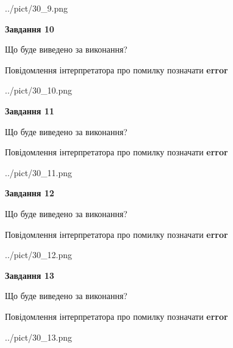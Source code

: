 \documentclass[11pt, ukrainian]{article}
\begin{document}
{\begin {large}
\begin{center}
	{../pict/30_9.png}
\end{center}
\newpage

{\begin {center}\textbf{Завдання 10}\end {center}}\par
Що буде виведено за виконання? \par
Повідомлення інтерпретатора про помилку позначати \textbf{error}

\begin{center}
	{../pict/30_10.png}
\end{center}
\newpage

{\begin {center}\textbf{Завдання 11}\end {center}}\par
Що буде виведено за виконання? \par
Повідомлення інтерпретатора про помилку позначати \textbf{error}

\begin{center}
	{../pict/30_11.png}
\end{center}
\newpage

{\begin {center}\textbf{Завдання 12}\end {center}}\par
Що буде виведено за виконання? \par
Повідомлення інтерпретатора про помилку позначати \textbf{error}

\begin{center}
	{../pict/30_12.png}
\end{center}
\newpage

{\begin {center}\textbf{Завдання 13}\end {center}}\par
Що буде виведено за виконання? \par
Повідомлення інтерпретатора про помилку позначати \textbf{error}

\begin{center}
	{../pict/30_13.png}
\end{center}
\newpage


\end{large}}
\end{document}
